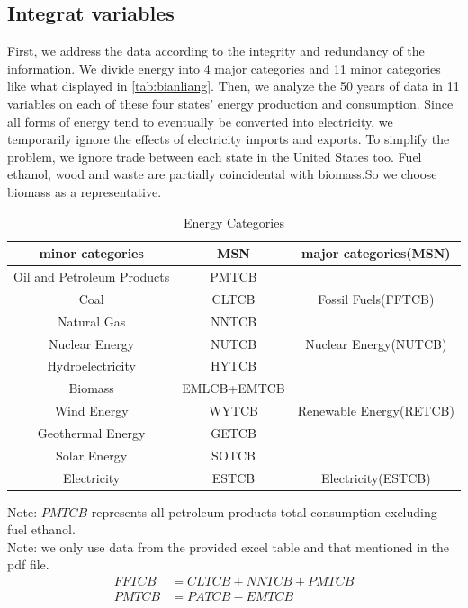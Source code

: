 \documentclass{mcmthesis}
\begin{document}
\subsection{Integrat variables}
First, we address the data according to the integrity and redundancy of the information. We divide energy into 4 major categories and 11 minor categories like what displayed in \autoref{tab:bianliang}. 
Then, we analyze the 50 years of data in 11 variables on each of these four states’ energy production and consumption. 
Since all forms of energy tend to eventually be converted into electricity, we temporarily ignore the effects of electricity imports and exports. To simplify the problem, we ignore trade between each state in the United States too. Fuel ethanol, wood and waste are partially coincidental with biomass.So we choose biomass as a representative. \\
\begin{table}[h]
	\begin{tabular}{ccc}%
		\toprule
		minor categories  & MSN & major categories(MSN) \\
		\midrule
		Oil and Petroleum Products & PMTCB& \\
		Coal & CLTCB & Fossil Fuels(FFTCB)\\
		Natural Gas & NNTCB & \\
		\midrule	
		Nuclear Energy &NUTCB& Nuclear Energy(NUTCB) \\
		\midrule
		Hydroelectricity & HYTCB &  \\
		Biomass &EMLCB+EMTCB &  \\
		Wind Energy& WYTCB & Renewable Energy(RETCB) \\
		Geothermal Energy 	&GETCB  &  \\
		Solar Energy 	& SOTCB&  \\
		\midrule
		Electricity &ESTCB&Electricity(ESTCB)\\
		\bottomrule                  
	\end{tabular}
	\caption{Energy Categories}                      %
	\label{tab:bianliang} 
\end{table}
Note: $ PMTCB  $ represents all petroleum products total consumption excluding fuel ethanol.\\
Note: we only use data from the provided excel table and that mentioned in the pdf file.
\begin{align}
FFTCB &= CLTCB + NNTCB + PMTCB\\
PMTCB &= PATCB - EMTCB
\end{align}
\end{document}
